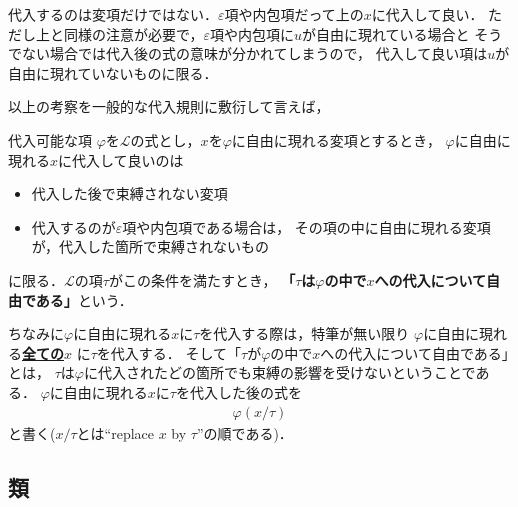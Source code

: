	代入するのは変項だけではない．$\varepsilon$項や内包項だって上の$x$に代入して良い．
	ただし上と同様の注意が必要で，$\varepsilon$項や内包項に$u$が自由に現れている場合と
	そうでない場合では代入後の式の意味が分かれてしまうので，
	代入して良い項は$u$が自由に現れていないものに限る．
	
	以上の考察を一般的な代入規則に敷衍して言えば，
	
	\begin{itembox}[l]{代入可能な項}
		$\varphi$を$\mathcal{L}$の式とし，$x$を$\varphi$に自由に現れる変項とするとき，
		$\varphi$に自由に現れる$x$に代入して良いのは
		\begin{itemize}
			\item 代入した後で束縛されない変項
			\item 代入するのが$\varepsilon$項や内包項である場合は，
				その項の中に自由に現れる変項が，代入した箇所で束縛されないもの
		\end{itemize}
		に限る．$\mathcal{L}$の項$\tau$がこの条件を満たすとき，
		{\bf 「$\tau$は$\varphi$の中で$x$への代入について自由である」}という．
	\end{itembox}
	
	ちなみに$\varphi$に自由に現れる$x$に$\tau$を代入する際は，特筆が無い限り
	$\varphi$に自由に現れる\underline{{\bf 全ての$x$}} に$\tau$を代入する．
	そして「$\tau$が$\varphi$の中で$x$への代入について自由である」とは，
	$\tau$は$\varphi$に代入されたどの箇所でも束縛の影響を受けないということである．
	$\varphi$に自由に現れる$x$に$\tau$を代入した後の式を
	\begin{align}
		\varphi(x/\tau)
	\end{align}
	と書く($x/\tau$とは``replace $x$ by $\tau$''の順である)．
	
\subsection{類}
	\begin{comment}
	\begin{screen}
		\begin{dfn}[閉項]
			どの変項も自由に現れない$\varepsilon$項を
			{\bf 閉${\boldsymbol \varepsilon}$項}\index{
			へいイプシロンこう@閉$\varepsilon$項}{\bf (closed epsilon term)}と呼び，
			どの変項も自由に現れない内包項を{\bf 閉内包項}\index{
			へいないほうこう@閉内包項}{\bf (closed comprehension term)}と呼ぶ．
			また閉$\varepsilon$項と閉内包項は以上のみである．
		\end{dfn}
	\end{screen}
	\end{comment}
	
